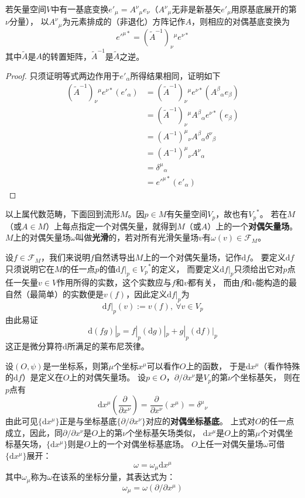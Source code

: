 \begin{theorem}
若矢量空间$V$中有一基底变换$e'_\mu = A^\nu{}_\mu e_\nu$（$A^\nu{}_\mu$无非是新基矢$e'_\mu$用原基底展开的第$\nu$分量），
以$A^\nu{}_\mu$为元素排成的（非退化）方阵记作$A$，则相应的对偶基底变换为
$$e'^{\mu*} = (\tilde{A}^{-1})_\nu{}^\mu e^{\nu*}$$
其中$\tilde{A}$是$A$的转置矩阵，$\tilde{A}^{-1}$是$\tilde{A}$之逆。
\end{theorem}

\begin{proof}
只须证明等式两边作用于$e'_\alpha$所得结果相同，证明如下
$$\begin{aligned}
(\tilde{A}^{-1})_\nu{}^\mu e^{\nu*}(e'_\alpha) & = (\tilde{A}^{-1})_\nu{}^\mu e^{\nu*}(A^\beta{}_\alpha e_\beta) \\
& = (\tilde{A}^{-1})_\nu{}^\mu A^\beta{}_\alpha e^{\nu*}(e_\beta) \\
& = (A^{-1})^\mu{}_\nu A^\beta{}_\alpha \delta^{\nu}{}_\beta \\
& = (A^{-1})^\mu{}_\nu A^\nu{}_\alpha \\
& = \delta^\mu{}_\alpha \\
& = e'^{\mu*}(e'_\alpha)
\end{aligned}$$
\end{proof}

以上属代数范畴，下面回到流形$M$。因$p \in M$有矢量空间$V_p$，故也有${V_p}^*$。
若在$M$（或$A \in M$）上每点指定一个对偶矢量，就得到$M$（或$A$）上的一个\textbf{对偶矢量场}。
$M$上的对偶矢量场$\omega$叫做\textbf{光滑}的，若对所有光滑矢量场$v$有$\omega(v) \in \mathscr{F}_M$。

设$f \in \mathscr{F}_M$，我们来说明$f$自然诱导出$M$上的一个对偶矢量场，记作$\mathrm{d}f$。
要定义$\mathrm{d}f$只须说明它在$M$的任一点$p$的值$\mathrm{d}f|_p \in {V_p}^*$的定义，
而要定义$\mathrm{d}f|_p$只须给出它对$p$点任一矢量$v \in V$作用所得的实数，这个实数应与$f$和$v$都有关，
而由$f$和$v$能构造的最自然（最简单）的实数便是$v(f)$，因此定义$\mathrm{d}f|_p$为
$$\mathrm{d}f|_p(v) := v(f), ~ \forall v \in V_p$$
由此易证
$$\mathrm{d}(fg)|_p = f|_p(\mathrm{d}g)|_p + g|_p(\mathrm{d}f)|_p$$
这正是微分算符$\mathrm{d}$所满足的莱布尼茨律。

设$(O, \psi)$是一坐标系，则第$\mu$个坐标$x^\mu$可以看作$O$上的函数，
于是$\mathrm{d}x^\mu$（看作特殊的$\mathrm{d}f$）是定义在$O$上的对偶矢量场。
设$p \in O$，$\partial / \partial x^\nu$是$V_p$的第$\nu$个坐标基矢，
则在$p$点有$$\mathrm{d}x^\mu\left(\frac{\partial}{\partial x^\nu}\right) = \frac{\partial}{\partial x^\nu}(x^\mu) = \delta^\mu{}_\nu$$
由此可见$\{\mathrm{d}x^\mu\}$正是与坐标基底$\{\partial / \partial x^\nu\}$对应的\textbf{对偶坐标基底}。
上式对$O$的任一点成立，因此，同$\partial / \partial x^\nu$是$O$上的第$\nu$个坐标基矢场类似，
$\mathrm{d}x^\mu$是$O$上的第$\mu$个对偶坐标基矢场，$\{\mathrm{d}x^\mu\}$则是$O$上的一个对偶坐标基底场。
$O$上任一对偶矢量场$\omega$可借$\{\mathrm{d}x^\mu\}$展开：$$\omega = \omega_\mu\mathrm{d}x^\mu$$
其中$\omega_\mu$称为$\omega$在该系的坐标分量，其表达式为：$$\omega_\mu = \omega(\partial / \partial x^\mu)$$

